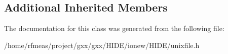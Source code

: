 \subsection*{Additional Inherited Members}


The documentation for this class was generated from the following file\+:\begin{DoxyCompactItemize}
\item 
/home/rfmeas/project/gxx/gxx/\+H\+I\+D\+E/ionew/\+H\+I\+D\+E/unixfile.\+h\end{DoxyCompactItemize}
